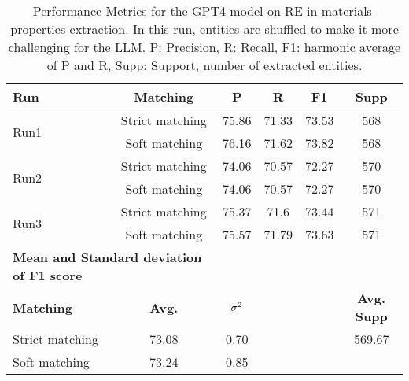 \begin{table}[htbp]
    \small
    \centering
    \caption{Performance Metrics for the GPT4 model on RE in materials-properties extraction. In this run, entities are shuffled to make it more challenging for the LLM. P: Precision, R: Recall, F1: harmonic average of P and R, Supp: Support, number of extracted entities.}
    \begin{tabular}{lccccc}
        \toprule
        \textbf{Run} & \textbf{Matching} & \textbf{P} & \textbf{R} & \textbf{F1} & \textbf{Supp} \\
        \midrule
        \multirow{2}{*}{Run1} & Strict matching & 75.86 & 71.33 & 73.53 & 568 \\
        & Soft matching & 76.16 & 71.62 & 73.82 & 568 \\
        \midrule
        \multirow{2}{*}{Run2} & Strict matching & 74.06 & 70.57 & 72.27 & 570 \\
        & Soft matching & 74.06 & 70.57 & 72.27 & 570 \\
        \midrule
        \multirow{2}{*}{Run3} & Strict matching & 75.37 & 71.6 & 73.44 & 571 \\
        & Soft matching & 75.57 & 71.79 & 73.63 & 571 \\
        \midrule
        \multicolumn{2}{l}{\textbf{Mean and Standard deviation of F1 score}} & & & & \\
        \midrule
        \textbf{Matching} & \textbf{Avg.} & $\sigma\textsuperscript{2}$ & & & \textbf{Avg. Supp}\\
        Strict matching & 73.08 & 0.70 & & & 569.67 \\
        Soft matching & 73.24 & 0.85 & & \\
        \bottomrule
    \end{tabular}
\end{table}

